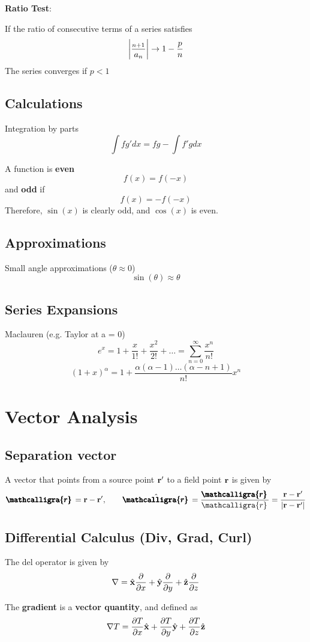 \documentclass{article}
\newcommand{\vh}[1]{\hat{\vb{#1}}}
\newcommand{\scriptr}{\mathcalligra{r}\,}
\newcommand{\boldscriptr}{\pmb{\mathcalligra{r}}\,}
\begin{document}
\textbf{Ratio Test}:

If the ratio of consecutive terms of a series satisfies 
$$
\abs{\frac{_{n+1}}{a_n}} \to 1-\frac{p}{n}
$$
The series converges if $p<1$

\subsection{Calculations}
Integration by parts
$$
\int fg' dx = fg-\int f' g dx
$$

A function is \textbf{even}
$$
f(x) = f(-x)
$$
and \textbf{odd} if
$$
f(x) = -f(-x)
$$
Therefore, $\sin(x)$  is clearly odd, and $\cos(x)$ is even.
\subsection{Approximations}
Small angle approximations ($\theta \approx 0$)
$$
\sin(\theta) \approx \theta
$$

\subsection{Series Expansions}
Maclauren (e.g. Taylor at a = 0)
$$
e^{x} = 1 + \frac{x}{1!} + \frac{x^2}{2!} + \dots = \sum_{n=0}^{\infty} \frac{x^n}{n!}
$$
$$
(1+x)^\alpha = 1 + \frac{\alpha(\alpha - 1) \dots (\alpha - n + 1)}{n!}x^{n}
$$

\section{Vector Analysis}
\subsection{Separation vector}
A vector that points from a source point $\vb{r}'$ to a field point $\vb{r}$ is given by 
$$
\boldscriptr = \vb{r} - \vb{r'}, \qquad \hat{\boldscriptr} = \frac{\boldscriptr}{\scriptr} = \frac{\vb{r} - \vb{r'}}{\abs{\vb{r} - \vb{r'}}}
$$

\subsection{Differential Calculus (Div, Grad, Curl)}
The del operator is given by 
$$
\nabla = \vh{x} \frac{\partial}{\partial x} + \vh{y} \frac{\partial}{\partial y} + \vh{z} \frac{\partial}{\partial z}
$$


The \textbf{gradient} is a \textbf{vector quantity}, and defined as 
$$
\nabla T = \frac{\partial T}{\partial x} \vh{x} + \frac{\partial T}{\partial y} \vh{y} + \frac{\partial T}{\partial z} \vh{z}
$$
\end{document}
